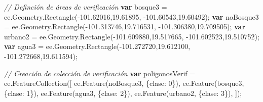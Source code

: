 \documentclass[
  12pt,
  letterpaper,
  twoside]{book}
\newenvironment{Shaded}{\begin{snugshade}}{\end{snugshade}}
\newcommand{\AttributeTok}[1]{\textcolor[rgb]{0.48,0.12,0.64}{#1}}
\newcommand{\CommentTok}[1]{\textcolor[rgb]{0.24,0.58,0.00}{\textit{#1}}}
\newcommand{\DecValTok}[1]{\textcolor[rgb]{0.28,0.53,0.93}{#1}}
\newcommand{\FloatTok}[1]{\textcolor[rgb]{0.28,0.53,0.93}{#1}}
\newcommand{\FunctionTok}[1]{\textcolor[rgb]{0.48,0.12,0.64}{#1}}
\newcommand{\KeywordTok}[1]{\textcolor[rgb]{0.00,0.00,0.00}{\textbf{#1}}}
\newcommand{\NormalTok}[1]{#1}
\newcommand{\OperatorTok}[1]{\textcolor[rgb]{0.00,0.00,0.00}{#1}}
\newcommand{\StringTok}[1]{\textcolor[rgb]{0.87,0.29,0.22}{#1}}
\begin{document}
\begin{Shaded}
\begin{Highlighting}[]
\CommentTok{// Definción de áreas de verificación}
\KeywordTok{var}\NormalTok{ bosque3 }\OperatorTok{=}\NormalTok{ ee}\OperatorTok{.}\AttributeTok{Geometry}\OperatorTok{.}\FunctionTok{Rectangle}\NormalTok{(}\OperatorTok{{-}}\FloatTok{101.62016}\OperatorTok{,}\FloatTok{19.61895}\OperatorTok{,} 
  \OperatorTok{{-}}\FloatTok{101.60543}\OperatorTok{,}\FloatTok{19.60492}\NormalTok{)}\OperatorTok{;}
\KeywordTok{var}\NormalTok{ noBosque3 }\OperatorTok{=}\NormalTok{ ee}\OperatorTok{.}\AttributeTok{Geometry}\OperatorTok{.}\FunctionTok{Rectangle}\NormalTok{(}\OperatorTok{{-}}\FloatTok{101.313746}\OperatorTok{,}\FloatTok{19.716531}\OperatorTok{,} 
  \OperatorTok{{-}}\FloatTok{101.306380}\OperatorTok{,}\FloatTok{19.709505}\NormalTok{)}\OperatorTok{;}
\KeywordTok{var}\NormalTok{ urbano2 }\OperatorTok{=}\NormalTok{ ee}\OperatorTok{.}\AttributeTok{Geometry}\OperatorTok{.}\FunctionTok{Rectangle}\NormalTok{(}\OperatorTok{{-}}\FloatTok{101.609880}\OperatorTok{,}\FloatTok{19.517665}\OperatorTok{,} 
  \OperatorTok{{-}}\FloatTok{101.602523}\OperatorTok{,}\FloatTok{19.510752}\NormalTok{)}\OperatorTok{;}
\KeywordTok{var}\NormalTok{ agua3 }\OperatorTok{=}\NormalTok{ ee}\OperatorTok{.}\AttributeTok{Geometry}\OperatorTok{.}\FunctionTok{Rectangle}\NormalTok{(}\OperatorTok{{-}}\FloatTok{101.272720}\OperatorTok{,}\FloatTok{19.612100}\OperatorTok{,} 
  \OperatorTok{{-}}\FloatTok{101.272668}\OperatorTok{,}\FloatTok{19.611594}\NormalTok{)}\OperatorTok{;}

\CommentTok{// Creación de colección de verificación}
\KeywordTok{var}\NormalTok{ poligonosVerif }\OperatorTok{=}\NormalTok{ ee}\OperatorTok{.}\FunctionTok{FeatureCollection}\NormalTok{([}
\NormalTok{  ee}\OperatorTok{.}\FunctionTok{Feature}\NormalTok{(noBosque3}\OperatorTok{,}\NormalTok{ \{}\StringTok{\textquotesingle{}clase\textquotesingle{}}\OperatorTok{:} \DecValTok{0}\NormalTok{\})}\OperatorTok{,}
\NormalTok{  ee}\OperatorTok{.}\FunctionTok{Feature}\NormalTok{(bosque3}\OperatorTok{,}\NormalTok{ \{}\StringTok{\textquotesingle{}clase\textquotesingle{}}\OperatorTok{:} \DecValTok{1}\NormalTok{\})}\OperatorTok{,}
\NormalTok{  ee}\OperatorTok{.}\FunctionTok{Feature}\NormalTok{(agua3}\OperatorTok{,}\NormalTok{ \{}\StringTok{\textquotesingle{}clase\textquotesingle{}}\OperatorTok{:} \DecValTok{2}\NormalTok{\})}\OperatorTok{,}
\NormalTok{  ee}\OperatorTok{.}\FunctionTok{Feature}\NormalTok{(urbano2}\OperatorTok{,}\NormalTok{ \{}\StringTok{\textquotesingle{}clase\textquotesingle{}}\OperatorTok{:} \DecValTok{3}\NormalTok{\})}\OperatorTok{,}
\NormalTok{])}\OperatorTok{;}
\end{Highlighting}
\end{Shaded}
\end{document}
